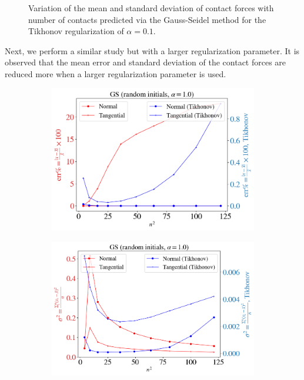 \begin{itemize}
\begin{figure}[H]
\begin{subfigure}{0.47\columnwidth}
		\end{subfigure}\label{fig:GS}
		\caption{Variation of the mean and standard deviation of contact forces with number of contacts predicted via the Gauss-Seidel method for the Tikhonov regularization of $\alpha=0.1$.}
	\end{figure}
	Next, we perform a similar study but with a larger regularization parameter. It is observed that the mean error and standard deviation of the contact forces are reduced more when a larger regularization parameter is used.
	\begin{figure}[H]
		\centering	
		\begin{subfigure}{0.46\columnwidth}	
			\centering
			\includegraphics[width=1.0\textwidth]{images/CD/GS_r_10_mean.png}
		\end{subfigure}
		\begin{subfigure}{0.48\columnwidth}	
			\centering
			\includegraphics[width=1.0\textwidth]{images/CD/GS_r_10_std.png}

\end{subfigure}
\end{figure}
\end{itemize}
